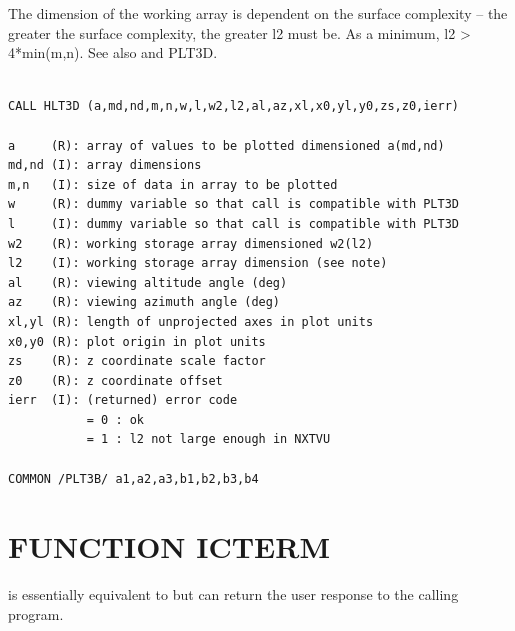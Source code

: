 \documentclass[11pt]{report}
\begin{document}
The dimension of the working array is dependent on the
surface complexity -- the greater the surface complexity, the greater
l2 must be.  As a minimum, l2 > 4*min(m,n).  See also  and PLT3D.
\begin{verbatim}

CALL HLT3D (a,md,nd,m,n,w,l,w2,l2,al,az,xl,x0,yl,y0,zs,z0,ierr)

a     (R): array of values to be plotted dimensioned a(md,nd)
md,nd (I): array dimensions
m,n   (I): size of data in array to be plotted
w     (R): dummy variable so that call is compatible with PLT3D
l     (I): dummy variable so that call is compatible with PLT3D
w2    (R): working storage array dimensioned w2(l2)
l2    (I): working storage array dimension (see note)
al    (R): viewing altitude angle (deg)
az    (R): viewing azimuth angle (deg)
xl,yl (R): length of unprojected axes in plot units
x0,y0 (R): plot origin in plot units
zs    (R): z coordinate scale factor
z0    (R): z coordinate offset
ierr  (I): (returned) error code
           = 0 : ok
           = 1 : l2 not large enough in NXTVU

COMMON /PLT3B/ a1,a2,a3,b1,b2,b3,b4
\end{verbatim}

\section{FUNCTION ICTERM}

 is essentially equivalent to  but can return the
user response to the calling program.
\end{document}
